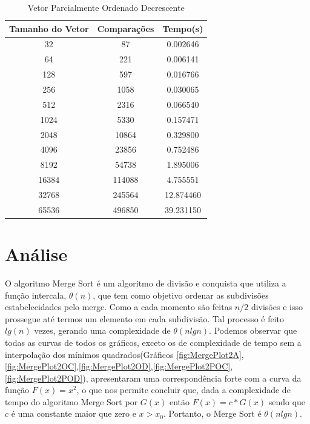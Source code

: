 \documentclass[12pt,a4paper,twoside]{report}
\begin{document}
\begin{table}[h]
  \centering
  \caption{Vetor Parcialmente Ordenado Decrescente \label{tab:pod}}
  \begin{tabular}{ccc} \\\hline
  \textbf{Tamanho do Vetor} & \textbf{Comparações} & \textbf{Tempo(s)} \\\hline
  32                        & 87                   & 0.002646          \\\hline
  64                        & 221                  & 0.006141          \\\hline
  128                       & 597                  & 0.016766          \\\hline
  256                       & 1058                 & 0.030065          \\\hline
  512                       & 2316                 & 0.066540          \\\hline
  1024                      & 5330                 & 0.157471          \\\hline
  2048                      & 10864                & 0.329800          \\\hline
  4096                      & 23856                & 0.752486         \\\hline
  8192                      & 54738                & 1.895006        \\\hline
  16384                     & 114088               & 4.755551        \\\hline
  32768                     & 245564               & 12.874460        \\\hline
  65536                     & 496850               & 39.231150        \\\hline
  \end{tabular}
\end{table}


\chapter{Análise}

O algoritmo Merge Sort é um algoritmo de divisão e conquista que utiliza a função intercala, $\theta(n)$, que tem como objetivo ordenar as subdivisões estabelecidades pelo merge. Como a cada momento são feitas $n/2$ divisões e isso prossegue até termos um elemento em cada subdivisão. Tal processo é feito $lg (n)$ vezes, gerando uma complexidade de $\theta(nlgn)$.
Podemos observar que todas as curvas de todos os gráficos, exceto os de complexidade de tempo sem a interpolação dos mínimos quadrados(Gráficos \ref{fig:MergePlot2A},\ref{fig:MergePlot2OC},\ref{fig:MergePlot2OD},\ref{fig:MergePlot2POC},\ref{fig:MergePlot2POD}), apresentaram uma correspondência forte com a curva da função $F(x) = x^2$, o que nos permite concluir que, dada a complexidade de tempo do algoritmo Merge Sort por $G(x)$ então $F(x) = c * G(x)$ sendo que $c$ é uma constante maior que zero e $x > x_0$. Portanto, o Merge Sort é $\theta(nlgn)$.
\end{document}
